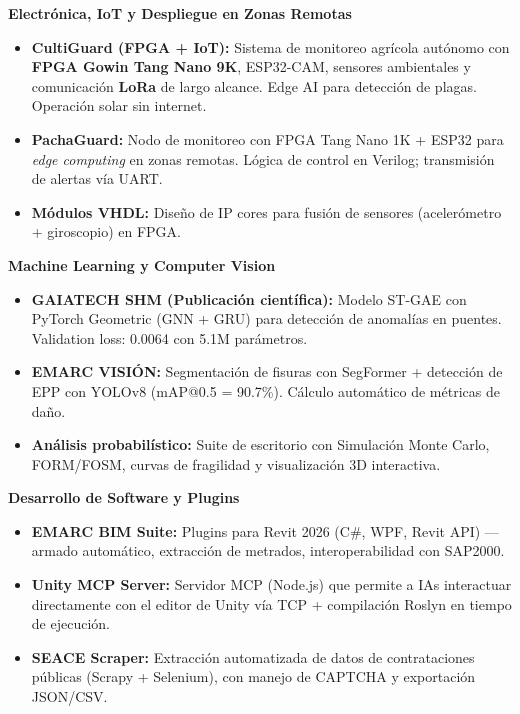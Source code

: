 \documentclass[10pt, a4paper]{article}
\begin{document}
\vspace{1mm}

\textbf{Electrónica, IoT y Despliegue en Zonas Remotas}
\begin{itemize}
    \item \textbf{CultiGuard (FPGA + IoT):} Sistema de monitoreo agrícola autónomo con \textbf{FPGA Gowin Tang Nano 9K}, ESP32-CAM, sensores ambientales y comunicación \textbf{LoRa} de largo alcance. Edge AI para detección de plagas. Operación solar sin internet.
    \item \textbf{PachaGuard:} Nodo de monitoreo con FPGA Tang Nano 1K + ESP32 para \textit{edge computing} en zonas remotas. Lógica de control en Verilog; transmisión de alertas vía UART.
    \item \textbf{Módulos VHDL:} Diseño de IP cores para fusión de sensores (acelerómetro + giroscopio) en FPGA.
\end{itemize}

\vspace{1mm}

\textbf{Machine Learning y Computer Vision}
\begin{itemize}
    \item \textbf{GAIATECH SHM (Publicación científica):} Modelo ST-GAE con PyTorch Geometric (GNN + GRU) para detección de anomalías en puentes. Validation loss: 0.0064 con 5.1M parámetros.
    \item \textbf{EMARC VISIÓN:} Segmentación de fisuras con SegFormer + detección de EPP con YOLOv8 (mAP@0.5 = 90.7\%). Cálculo automático de métricas de daño.
    \item \textbf{Análisis probabilístico:} Suite de escritorio con Simulación Monte Carlo, FORM/FOSM, curvas de fragilidad y visualización 3D interactiva.
\end{itemize}

\vspace{1mm}

\textbf{Desarrollo de Software y Plugins}
\begin{itemize}
    \item \textbf{EMARC BIM Suite:} Plugins para Revit 2026 (C\#, WPF, Revit API) — armado automático, extracción de metrados, interoperabilidad con SAP2000.
    \item \textbf{Unity MCP Server:} Servidor MCP (Node.js) que permite a IAs interactuar directamente con el editor de Unity vía TCP + compilación Roslyn en tiempo de ejecución.
    \item \textbf{SEACE Scraper:} Extracción automatizada de datos de contrataciones públicas (Scrapy + Selenium), con manejo de CAPTCHA y exportación JSON/CSV.
\end{itemize}
\end{document}
